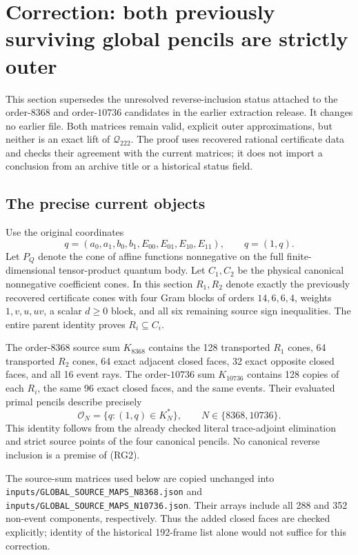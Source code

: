 \section{Correction: both previously surviving global pencils are strictly outer}
\label{sec:current-global-candidate-correction}

This section supersedes the unresolved reverse-inclusion status attached to
the order-$8368$ and order-$10736$ candidates in the earlier extraction
release.  It changes no earlier file.  Both matrices remain valid,
explicit outer approximations, but neither is an exact lift of
$\mathcal Q_{222}$.  The proof uses recovered rational certificate data
and checks their agreement with the current matrices; it does not import
a conclusion from an archive title or a historical status field.

\subsection{The precise current objects}

Use the original coordinates
\[
 q=(a_0,a_1,b_0,b_1,E_{00},E_{01},E_{10},E_{11}),\qquad
 \widehat q=(1,q).                                                   \tag{RG1}
\]
Let $P_Q$ denote the cone of affine functions nonnegative on the full
finite-dimensional tensor-product quantum body.  Let $C_1,C_2$ be the
physical canonical nonnegative coefficient cones.  In this section
$R_1,R_2$ denote exactly the previously recovered certificate cones with
four Gram blocks of orders $14,6,6,4$, weights $1,v,u,uv$, a scalar
$d\geq0$ block, and all six remaining source sign inequalities.
The entire parent identity proves $R_i\subseteq C_i$.

The order-$8368$ source sum $K_{8368}$ contains the 128 transported
$R_1$ cones, 64 transported $R_2$ cones, 64 exact adjacent closed faces,
32 exact opposite closed faces, and all 16 event rays.  The order-$10736$
sum $K_{10736}$ contains 128 copies of each $R_i$, the same 96 exact
closed faces, and the same events.  Their evaluated primal pencils
describe precisely
\[
 \mathcal O_N=\{q:(1,q)\in K_N^*\},\qquad N\in\{8368,10736\}.       \tag{RG2}
\]
This identity follows from the already checked literal trace-adjoint
elimination and strict source points of the four canonical pencils.
No canonical reverse inclusion is a premise of (RG2).

The source-sum matrices used below are copied unchanged into
\nolinkurl{inputs/GLOBAL_SOURCE_MAPS_N8368.json} and
\nolinkurl{inputs/GLOBAL_SOURCE_MAPS_N10736.json}.  Their arrays include
all 288 and 352 non-event components, respectively.  Thus the added
closed faces are checked explicitly; identity of the historical
192-frame list alone would not suffice for this correction.

